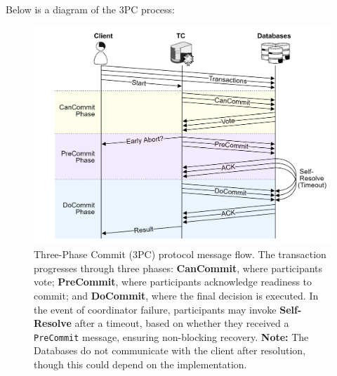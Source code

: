 \noindent
Below is a diagram of the 3PC process:
\begin{figure}[h]
    \centering
    \includegraphics[width=\textwidth]{Sections/trans/3PC.png}
    \caption{Three-Phase Commit (3PC) protocol message flow. The transaction progresses through three phases: \textbf{CanCommit}, where participants vote; \textbf{PreCommit}, where participants acknowledge readiness to commit; and \textbf{DoCommit}, where the final decision is executed. In the event of coordinator failure, participants may invoke \textbf{Self-Resolve} after a timeout, based on whether they received a \texttt{PreCommit} message, ensuring non-blocking recovery.
    \textbf{Note:} The Databases do not communicate with the client after resolution, though this could depend on the implementation.}
    \label{fig:3pc}
\end{figure}